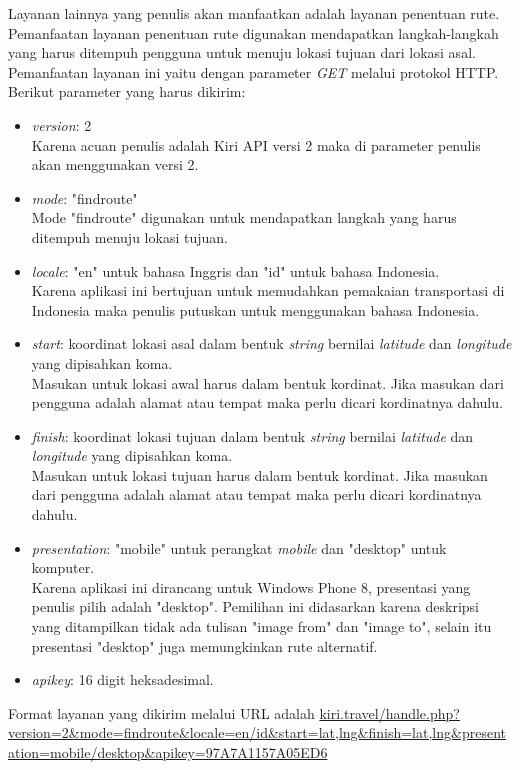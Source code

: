 Layanan lainnya yang penulis akan manfaatkan adalah layanan penentuan rute. Pemanfaatan layanan penentuan rute digunakan mendapatkan langkah-langkah yang harus ditempuh pengguna untuk menuju lokasi tujuan dari lokasi asal. Pemanfaatan layanan ini yaitu dengan parameter \textit{GET} melalui protokol HTTP. Berikut parameter yang harus dikirim:
\begin{itemize}
	\item \textit{version}: 2 \\
	Karena acuan penulis adalah Kiri API versi 2 maka di parameter penulis akan menggunakan versi 2.
	\item \textit{mode}: "findroute" \\
	Mode "findroute" digunakan untuk mendapatkan langkah yang harus ditempuh menuju lokasi tujuan.
	\item \textit{locale}: "en" untuk bahasa Inggris dan "id" untuk bahasa Indonesia. \\
	Karena aplikasi ini bertujuan untuk memudahkan pemakaian transportasi di Indonesia maka penulis putuskan untuk menggunakan bahasa Indonesia.
	\item \textit{start}: koordinat lokasi asal dalam bentuk \textit{string} bernilai \textit{latitude} dan \textit{longitude} yang dipisahkan koma. \\
	Masukan untuk lokasi awal harus dalam bentuk kordinat. Jika masukan dari pengguna adalah alamat atau tempat maka perlu dicari kordinatnya dahulu.
	\item \textit{finish}: koordinat lokasi tujuan dalam bentuk \textit{string} bernilai \textit{latitude} dan \textit{longitude} yang dipisahkan koma. \\
	Masukan untuk lokasi tujuan harus dalam bentuk kordinat. Jika masukan dari pengguna adalah alamat atau tempat maka perlu dicari kordinatnya dahulu.
	\item \textit{presentation}: "mobile" untuk perangkat \textit{mobile} dan "desktop" untuk komputer. \\
	Karena aplikasi ini dirancang untuk Windows Phone 8, presentasi yang penulis pilih adalah "desktop". Pemilihan ini didasarkan karena deskripsi yang ditampilkan tidak ada tulisan "image from" dan "image to", selain itu presentasi "desktop" juga memungkinkan rute alternatif. 
	\item \textit{apikey}: 16 digit heksadesimal.
\end{itemize}

Format layanan yang dikirim melalui URL adalah \url{kiri.travel/handle.php?version=2&mode=findroute&locale=en/id&start=lat,lng&finish=lat,lng&presentation=mobile/desktop&apikey=97A7A1157A05ED6}

